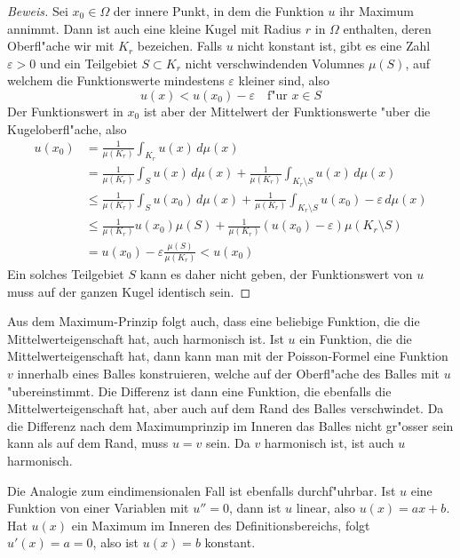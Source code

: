 \begin{proof}[Beweis]
Sei $x_0\in\Omega$ der innere Punkt, in dem die Funktion $u$
ihr Maximum annimmt. Dann ist auch eine kleine Kugel mit Radius
$r$ in $\Omega$ enthalten, deren Oberfl"ache wir mit $K_r$
bezeichen. Falls $u$ nicht konstant ist, gibt
es eine Zahl $\varepsilon > 0$ und 
ein Teilgebiet $S\subset K_r$ nicht verschwindenden Volumnes $\mu(S)$,
auf welchem die Funktionswerte
mindestens $\varepsilon$ kleiner sind, also
\[
u(x)<u(x_0)-\varepsilon\quad\text{f"ur $x\in S$}
\]
Der Funktionswert in $x_0$ ist aber der Mittelwert der Funktionswerte
"uber die Kugeloberfl"ache, also
\begin{align*}
u(x_0)
&=
\frac1{\mu(K_r)}\int_{K_r}u(x)\,d\mu(x)
\\
&=\frac1{\mu(K_r)}\int_Su(x)\,d\mu(x)+\frac1{\mu(K_r)}\int_{K_r\setminus S}u(x)\,d\mu(x)
\\
&\le \frac1{\mu(K_r)}\int_S u(x_0)\,d\mu(x)+\frac1{\mu(K_r)}\int_{K_r\setminus S}u(x_0)-\varepsilon\,d\mu(x)
\\
&\le \frac1{\mu(K_r)}u(x_0)\mu(S)+\frac1{\mu(K_r)}(u(x_0)-\varepsilon)\mu(K_r\setminus S)
\\
&=
u(x_0)-\varepsilon\frac{\mu(S)}{\mu(K_r)}<u(x_0)
\end{align*}
Ein solches Teilgebiet $S$ kann es daher nicht geben, der Funktionswert
von $u$ muss auf der ganzen Kugel identisch sein.
\end{proof}

Aus dem Maximum-Prinzip folgt auch, dass eine beliebige Funktion, die
die Mittelwerteigenschaft hat, auch harmonisch ist. Ist $u$ ein
Funktion, die die Mittelwerteigenschaft hat, dann kann man mit der
Poisson-Formel eine Funktion $v$ innerhalb eines Balles konstruieren,
welche auf der Oberfl"ache des Balles mit $u$ "ubereinstimmt.
Die Differenz ist dann eine Funktion, die ebenfalls die Mittelwerteigenschaft
hat, aber auch auf dem Rand des Balles verschwindet. Da die Differenz
nach dem Maximumprinzip
im Inneren das Balles nicht gr"osser sein kann als auf dem Rand,
muss $u=v$ sein. Da $v$ harmonisch ist, ist auch $u$ harmonisch.

Die Analogie zum eindimensionalen Fall ist ebenfalls durchf"uhrbar.
Ist $u$ eine Funktion von einer Variablen mit $u''=0$, dann ist
$u$ linear, also $u(x)=ax+b$. Hat $u(x)$ ein Maximum im Inneren
des Definitionsbereichs, folgt $u'(x)=a=0$, also ist $u(x)=b$ konstant.

